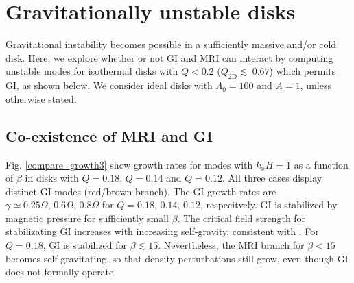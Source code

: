 \section{Gravitationally unstable disks} \label{result2}
Gravitational instability becomes possible in a sufficiently
massive and/or cold disk. Here, we explore whether or not GI and MRI
can interact by computing unstable modes for isothermal disks with $Q < 0.2 $
($Q_\mathrm{2D}\lesssim ~0.67$) which permits GI, as shown below.
We consider ideal disks with $\Lambda_0=100$ and $A=1$, unless
otherwise stated.  

\subsection{Co-existence of MRI and GI} 
Fig. \ref{compare_growth3} show growth rates for modes with $k_xH=1$
as a function of $\beta$ in disks with $Q=0.18$, $Q=0.14$ and
$Q=0.12$.   
All three cases display distinct GI modes (red/brown branch). The GI 
growth rates are $\gamma\simeq 0.25\Omega,\,0.6\Omega,\,0.8\Omega$ for
$Q=0.18,\,0.14,\,0.12$, respecitvely. GI is stabilized by magnetic
pressure for sufficiently small $\beta$. The critical
field strength for stabilizating GI increases with increasing
self-gravity, consistent with \cite{nakamura83}.   
For $Q=0.18$, GI is stabilized for $\beta \lesssim 15$. Nevertheless, 
the MRI branch for $\beta < 15$ becomes self-gravitating, so that
density perturbations still grow, even though GI does not
formally operate.  


